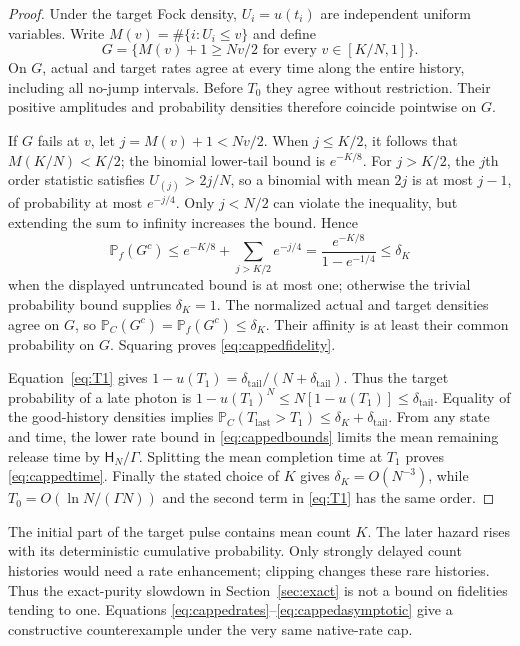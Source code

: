 \documentclass[11pt,a4paper]{article}
\newcommand{\Prob}{\mathbb P}
\newcommand{\HH}{\mathsf H}
\begin{document}
\begin{proof}
Under the target Fock density, \(U_i=u(t_i)\) are independent
uniform variables. Write \(M(v)=\#\{i:U_i\le v\}\) and define
\begin{equation}
 G=\{M(v)+1\ge Nv/2\text{ for every }v\in[K/N,1]\}.
 \label{eq:good}
\end{equation}
On \(G\), actual and target rates agree at every time along the
entire history, including all no-jump intervals. Before \(T_0\)
they agree without restriction. Their positive amplitudes and
probability densities therefore coincide pointwise on \(G\).

If \(G\) fails at \(v\), let \(j=M(v)+1<Nv/2\).
When \(j\le K/2\), it follows that
\(M(K/N)<K/2\); the binomial lower-tail bound is \(e^{-K/8}\).
For \(j>K/2\), the \(j\)th order statistic satisfies
\(U_{(j)}>2j/N\), so a binomial with mean \(2j\) is at most
\(j-1\), of probability at most \(e^{-j/4}\).
Only \(j<N/2\) can violate the inequality, but extending the sum
to infinity increases the bound. Hence
\begin{equation}
 \Prob_f(G^c)
 \le e^{-K/8}+\sum_{j>K/2}e^{-j/4}
 =\frac{e^{-K/8}}{1-e^{-1/4}}\le\delta_K
\end{equation}
when the displayed untruncated bound is at most one; otherwise
the trivial probability bound supplies \(\delta_K=1\).
The normalized actual and target densities agree on \(G\), so
\(\Prob_C(G^c)=\Prob_f(G^c)\le\delta_K\).
Their affinity is at least their common probability on \(G\).
Squaring proves \eqref{eq:cappedfidelity}.

Equation~\eqref{eq:T1} gives
\(1-u(T_1)=\delta_{\mathrm{tail}}/(N+\delta_{\mathrm{tail}})\).
Thus the target probability of a late photon is
\(1-u(T_1)^N\le N[1-u(T_1)]\le\delta_{\mathrm{tail}}\).
Equality of the good-history densities implies
\(\Prob_C(T_{\mathrm{last}}>T_1)\le\delta_K+\delta_{\mathrm{tail}}\).
From any state and time, the lower rate bound in
\eqref{eq:cappedbounds} limits the mean remaining release time
by \(\HH_N/\Gamma\). Splitting the mean completion time at
\(T_1\) proves \eqref{eq:cappedtime}. Finally the stated choice
of \(K\) gives \(\delta_K=O(N^{-3})\), while
\(T_0=O(\ln N/(\Gamma N))\) and the second term in
\eqref{eq:T1} has the same order.
\end{proof}

The initial part of the target pulse contains mean count \(K\).
The later hazard rises with its deterministic cumulative
probability. Only strongly delayed count histories would need
a rate enhancement; clipping changes these rare histories.
Thus the exact-purity slowdown in Section~\ref{sec:exact} is not
a bound on fidelities tending to one. Equations
\eqref{eq:cappedrates}--\eqref{eq:cappedasymptotic} give a
constructive counterexample under the very same native-rate cap.
\end{document}
